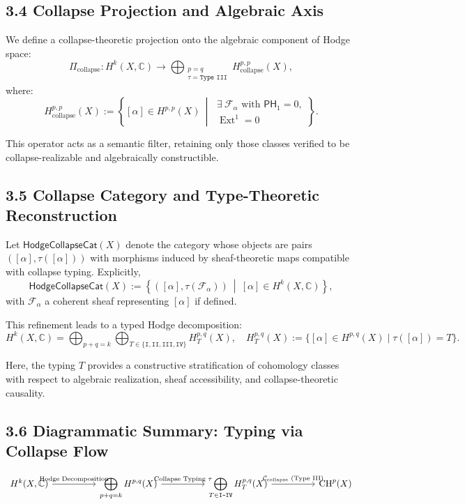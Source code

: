 \documentclass[11pt]{article}
\DeclareMathOperator{\Ext}{Ext}
\begin{document}
\subsection{3.4 Collapse Projection and Algebraic Axis}

We define a collapse-theoretic projection onto the algebraic component of Hodge space:
\[
\Pi_{\text{collapse}}: H^k(X, \mathbb{C}) \longrightarrow \bigoplus_{\substack{p=q \\ \tau = \texttt{Type III}}} H^{p,p}_{\text{collapse}}(X),
\]
where:
\[
H^{p,p}_{\text{collapse}}(X) := \left\{ [\alpha] \in H^{p,p}(X)\ \middle|\
\begin{array}{l}
\exists\ \mathcal{F}_\alpha \text{ with } \mathsf{PH}_1 = 0, \\
\Ext^1 = 0
\end{array} \right\}.
\]

This operator acts as a semantic filter, retaining only those classes verified to be collapse-realizable and algebraically constructible.

\subsection{3.5 Collapse Category and Type-Theoretic Reconstruction}

Let $\mathsf{HodgeCollapseCat}(X)$ denote the category whose objects are pairs $([\alpha], \tau([\alpha]))$ with morphisms induced by sheaf-theoretic maps compatible with collapse typing. Explicitly,
\[
\mathsf{HodgeCollapseCat}(X) := \left\{ ([\alpha], \tau(\mathcal{F}_\alpha))\ \middle|\
[\alpha] \in H^k(X, \mathbb{C}) \right\},
\]
with $\mathcal{F}_\alpha$ a coherent sheaf representing $[\alpha]$ if defined.

This refinement leads to a typed Hodge decomposition:
\[
H^k(X, \mathbb{C}) = \bigoplus_{p+q=k} \bigoplus_{T \in \{\texttt{I}, \texttt{II}, \texttt{III}, \texttt{IV}\}} H^{p,q}_T(X),
\quad
H^{p,q}_T(X) := \{ [\alpha] \in H^{p,q}(X) \mid \tau([\alpha]) = T \}.
\]

Here, the typing $T$ provides a constructive stratification of cohomology classes with respect to algebraic realization, sheaf accessibility, and collapse-theoretic causality.

\subsection{3.6 Diagrammatic Summary: Typing via Collapse Flow}

\[
\begin{tikzcd}[row sep=large, column sep=huge]
H^k(X, \mathbb{C}) \arrow[r, "\text{Hodge Decomposition}"]
& \displaystyle \bigoplus_{p+q=k} H^{p,q}(X)
\arrow[r, "\text{Collapse Typing } \tau"]
& \displaystyle \bigoplus_{T \in \texttt{I–IV}} H^{p,q}_T(X)
\arrow[r, "\mathcal{C}_{\text{collapse}} \text{ (Type III)}"]
& \mathrm{CH}^p(X)
\end{tikzcd}
\]
\end{document}
